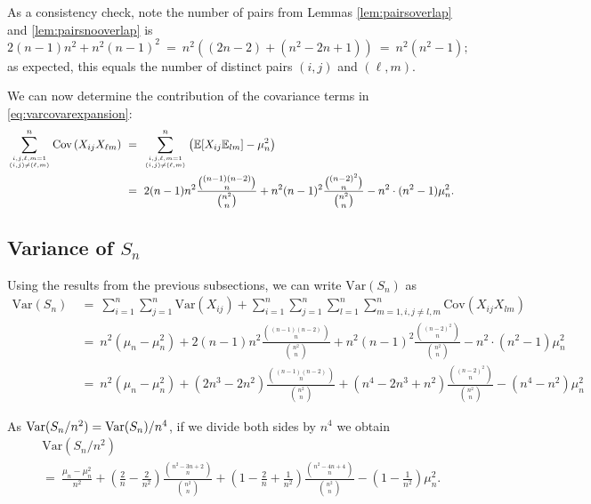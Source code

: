 \documentclass[12pt,reqno]{amsart}
\newcommand{\E}{\mathbb{E}}
\renewcommand{\E}{\mathbb{E}}
\numberwithin{equation}{section}
\theoremstyle{plain}
\newcommand\be{\begin{equation}}
\newcommand\ee{\end{equation}}
\newcommand{\ncr}[2]{{#1 \choose #2}}
\begin{document}
As a consistency check, note the number of pairs from Lemmas \ref{lem:pairsoverlap} and \ref{lem:pairsnooverlap} is \be 2(n-1)n^2 + n^2 (n-1)^2 \ = \ n^2\left((2n-2) + (n^2 - 2n + 1)\right) \ = \ n^2 (n^2 - 1); \ee as expected, this equals the number of distinct pairs $(i,j)$ and $(\ell, m)$.

We can now determine the contribution of the covariance terms in \eqref{eq:varcovarexpansion}:
\begin{align}
    \sum_{i,j, \ell, m = 1 \atop (i,j) \neq (\ell,m)}^n \text{Cov}\left(X_{ij}X_{\ell m}\right) &\ = \   \sum_{i,j, \ell, m = 1 \atop (i,j) \neq (\ell,m)}^n \left(\E[X_{ij}\E_{lm}] - \mu_n^2\right) \nonumber\\
    &\ = \  2(n-1)n^2 \frac{\ncr{(n-1)(n-2)}{n}}{\ncr{n^2}{n}} + n^2(n-1)^2\frac{\ncr{(n-2)^2}{n}}{\ncr{n^2}{n}} - n^2  \cdot  (n^2 - 1)\mu_n^2.
\end{align}


\subsection{Variance of $S_n$}

Using the results from the previous subsections, we can write $\text{Var}(S_n)$ as
\begin{align}
    \text{Var}(S_n) &\ = \  \sum_{i = 1}^n\sum_{j=1}^n\text{Var}(X_{ij}) + \sum_{i=1}^n\sum_{j=1}^n \sum_{l=1}^n\sum_{m=1, i,j \neq l,m}^n\text{Cov}(X_{ij}X_{lm}) \nonumber\\
    &\ = \  n^2(\mu_n - \mu_n^2) + 2(n-1)n^2 \frac{\ncr{(n-1)(n-2)}{n}}{\ncr{n^2}{n}} + n^2(n-1)^2\frac{\ncr{(n-2)^2}{n}}{\ncr{n^2}{n}} - n^2  \cdot  (n^2 - 1)\mu_n^2  \nonumber\\
    &\ = \  n^2(\mu_n - \mu_n^2) + (2n^3 - 2n^2) \frac{\ncr{(n-1)(n-2)}{n}}{\ncr{n^2}{n}} + (n^4-2n^3 + n^2)\frac{\ncr{(n-2)^2}{n}}{\ncr{n^2}{n}} - (n^4 - n^2)\mu_n^2
\end{align}

As ${\rm Var}(S_n/n^2) = {\rm Var}(S_n)/n^4$, if we divide both sides by $n^4$ we obtain
\begin{eqnarray}
 & & \text{Var}(S_n/n^2)\nonumber\\
&    & = \  \frac{\mu_n - \mu_n^2}{n^2} + \left(\frac{2}{n} - \frac{2}{n^2}\right) \frac{\ncr{n^2 - 3n + 2}{n}}{\ncr{n^2}{n}} + \left(1-\frac{2}{n} + \frac{1}{n^2}\right)\frac{\ncr{n^2-4n+4}{n}}{\ncr{n^2}{n}} - \left(1 - \frac{1}{n^2}\right)\mu_n^2. \nonumber\\
\end{eqnarray}
\end{document}
